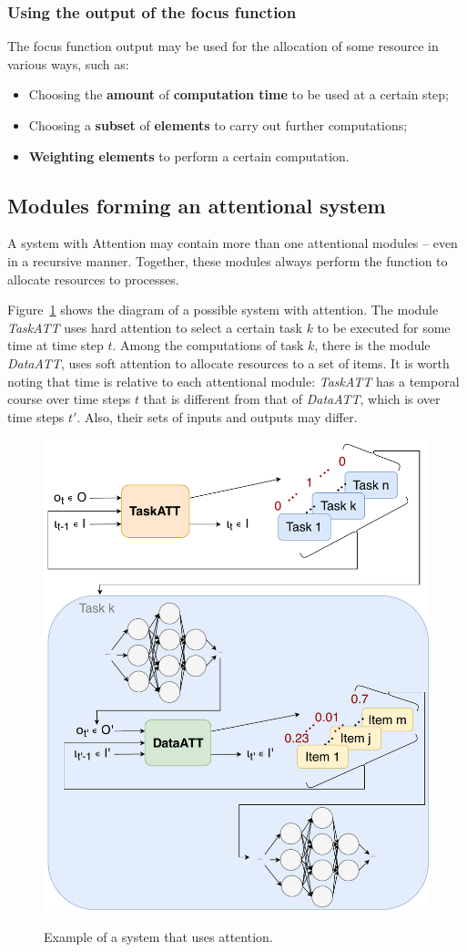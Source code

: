 \documentclass[11pt]{article}
\begin{document}
\subsubsection{Using the output of the focus function}
The focus function output may be used for the allocation of some resource in various ways, such as:
\begin{itemize}
    \item Choosing the \textbf{amount} of \textbf{computation time} to be used at a certain step;
    \item Choosing a \textbf{subset} of \textbf{elements} to carry out further computations;
    \item \textbf{Weighting elements} to perform a certain computation.
\end{itemize}

\subsection{Modules forming an attentional system}
A system with Attention may contain more than one attentional modules -- even in a recursive manner.
Together, these modules always perform the function to allocate resources to
processes.

Figure~\ref{fig:attsystem} shows the diagram of a possible system with attention.
The module \emph{TaskATT} uses hard attention to select a certain task $k$ to be executed for some time at time step $t$.
Among the computations of task $k$, there is the module \emph{DataATT}, uses soft attention to allocate resources to a set of items.
It is worth noting that time is relative to each attentional module: \emph{TaskATT} has a temporal course over time steps $t$ that is different from that of \emph{DataATT}, which is over time steps $t'$.
Also, their sets of inputs and outputs may differ.

\begin{figure}[H]
    \centering
    \includegraphics[width=0.7\linewidth]{./img/att_blocks_example.pdf}
    \label{fig:attsystem}
    \caption{Example of a system that uses attention.}
\end{figure}
\end{document}

